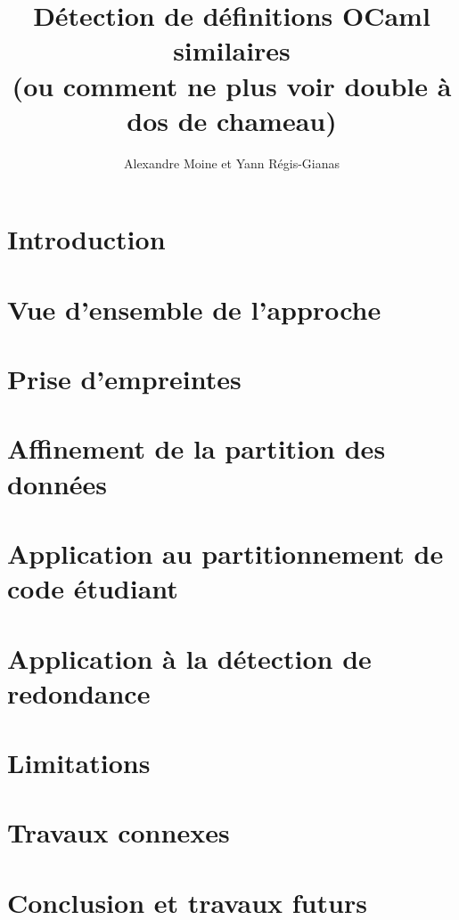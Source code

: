 \documentclass[a4paper]{easychair}
\title{Détection de définitions OCaml similaires \\
(ou comment ne plus voir double à dos de chameau)}
\author{Alexandre Moine et Yann Régis-Gianas}
\institute{Université de Paris}
\begin{document}
\maketitle

\begin{abstract}

\end{abstract}

\section{Introduction}


\section{Vue d'ensemble de l'approche}
\label{sec:overview}


\section{Prise d'empreintes}
\label{sec:hash}


\section{Affinement de la partition des données}
\label{sec:clustering}


\section{Application au partitionnement de code étudiant}
\label{sec:partition}


\section{Application à la détection de redondance}
\label{sec:redundancy}


\section{Limitations}
\label{sec:limitations}


\section{Travaux connexes}
\label{sec:related-work}


\section{Conclusion et travaux futurs}
\label{sec:conclusion}





\end{document}

